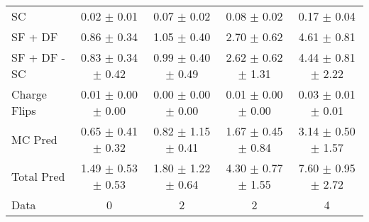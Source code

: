 \begin{tabular}{l|cccc}
                                 SC &  0.02 $\pm$  0.01 &  0.07 $\pm$  0.02 &  0.08 $\pm$  0.02 &  0.17 $\pm$  0.04 \\
                            SF + DF &  0.86 $\pm$  0.34 &  1.05 $\pm$  0.40 &  2.70 $\pm$  0.62 &  4.61 $\pm$  0.81 \\
\hline
                       SF + DF - SC &  0.83 $\pm$  0.34 $\pm$  0.42 &  0.99 $\pm$  0.40 $\pm$  0.49 &  2.62 $\pm$  0.62 $\pm$  1.31 &  4.44 $\pm$  0.81 $\pm$  2.22 \\
\hline\hline
                       Charge Flips &  0.01 $\pm$  0.00 $\pm$  0.00 &  0.00 $\pm$  0.00 $\pm$  0.00 &  0.01 $\pm$  0.00 $\pm$  0.00 &  0.03 $\pm$  0.01 $\pm$  0.01 \\
\hline
                            MC Pred &  0.65 $\pm$  0.41 $\pm$  0.32 &  0.82 $\pm$  1.15 $\pm$  0.41 &  1.67 $\pm$  0.45 $\pm$  0.84 &  3.14 $\pm$  0.50 $\pm$  1.57 \\
\hline
                         Total Pred &  1.49 $\pm$  0.53 $\pm$  0.53 &  1.80 $\pm$  1.22 $\pm$  0.64 &  4.30 $\pm$  0.77 $\pm$  1.55 &  7.60 $\pm$  0.95 $\pm$  2.72 \\
\hline\hline
                               Data &     0 &     2 &     2 &     4 \\
\hline\hline
\end{tabular}

